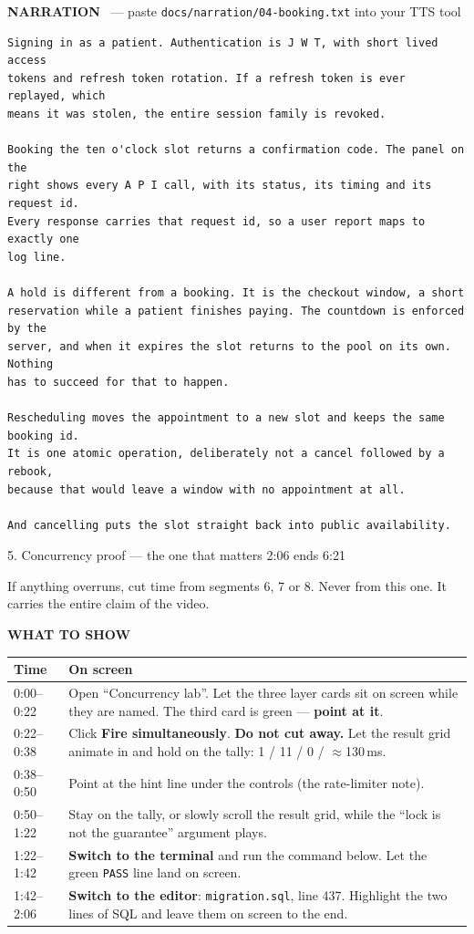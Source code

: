 \documentclass[11pt,a4paper]{article}
\newcommand{\segbar}[3]{%
  \vspace{12pt}
  \noindent\colorbox{accent}{\parbox{\dimexpr\textwidth-2\fboxsep}{%
    \color{white}\bfseries\large\strut #1 \hfill \normalsize #2 \quad ends #3}}
  \par\vspace{7pt}}
\newcommand{\showhdr}{\noindent\textcolor{showc}{\textbf{WHAT TO SHOW}}\par\vspace{2pt}}
\newcommand{\voicehdr}[1]{\vspace{4pt}\noindent\textcolor{voice}{\textbf{NARRATION}}%
  \ \textcolor{soft}{\small --- paste \texttt{docs/narration/#1.txt} into your TTS tool}\par\vspace{2pt}}
\begin{document}
\voicehdr{04-booking}
\begin{lstlisting}[style=tts]
Signing in as a patient. Authentication is J W T, with short lived access
tokens and refresh token rotation. If a refresh token is ever replayed, which
means it was stolen, the entire session family is revoked.

Booking the ten o'clock slot returns a confirmation code. The panel on the
right shows every A P I call, with its status, its timing and its request id.
Every response carries that request id, so a user report maps to exactly one
log line.

A hold is different from a booking. It is the checkout window, a short
reservation while a patient finishes paying. The countdown is enforced by the
server, and when it expires the slot returns to the pool on its own. Nothing
has to succeed for that to happen.

Rescheduling moves the appointment to a new slot and keeps the same booking id.
It is one atomic operation, deliberately not a cancel followed by a rebook,
because that would leave a window with no appointment at all.

And cancelling puts the slot straight back into public availability.
\end{lstlisting}

\segbar{5. Concurrency proof --- the one that matters}{2:06}{6:21}

\begin{note}
If anything overruns, cut time from segments 6, 7 or 8. Never from this one.
It carries the entire claim of the video.
\end{note}

\showhdr
\begin{longtable}{@{}p{1.6cm} p{13.4cm}@{}}
\toprule
\textbf{Time} & \textbf{On screen} \\
\midrule
\endhead
0:00--0:22 & Open ``Concurrency lab''. Let the three layer cards sit on screen while
             they are named. The third card is green --- \textbf{point at it}. \\
0:22--0:38 & Click \textbf{Fire simultaneously}. \textbf{Do not cut away.} Let the
             result grid animate in and hold on the tally: 1 / 11 / 0 / $\approx$130\,ms. \\
0:38--0:50 & Point at the hint line under the controls (the rate-limiter note). \\
0:50--1:22 & Stay on the tally, or slowly scroll the result grid, while the
             ``lock is not the guarantee'' argument plays. \\
1:22--1:42 & \textbf{Switch to the terminal} and run the command below. Let the green
             \texttt{PASS} line land on screen. \\
1:42--2:06 & \textbf{Switch to the editor}: \texttt{migration.sql}, line 437. Highlight
             the two lines of SQL and leave them on screen to the end. \\
\bottomrule
\end{longtable}
\end{document}
